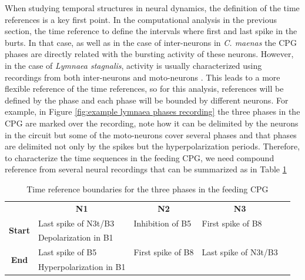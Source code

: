 When studying temporal structures in neural dynamics, the definition of the time references is a key first point. In the computational analysis in the previous section, the time reference to define the intervals where first and last spike in the burts. In that case, as well as in the case of inter-neurons in \textit{C. maenas} the CPG phases are directly related with the bursting activity of these neurons. However, in the case of \textit{Lymnaea stagnalis}, activity is usually characterized using recordings from both inter-neurons and moto-neurons \parencite{elliot, benjamin, crossley}. This leads to a more flexible reference of the time references, so for this analysis, references will be defined by the phase and each phase will be bounded by different neurons. For example, in Figure \ref{fig:example lymnaea phases recording} the three phases in the  CPG are marked over the recording, note how it can be delimited by the neurons in the circuit but some of the moto-neurons cover several phases and that phases are delimited not only by the spikes but the hyperpolarization periods. Therefore, to characterize the time sequences in the feeding CPG, we need compound reference from several neural recordings that can be summarized as in Table \ref{table:cpg ref intervals}

\begin{table}[]
	\begin{tabular}{cl|l|ll}
		\multicolumn{1}{l}{}                                 & \multicolumn{1}{c|}{\textbf{N1}} & \multicolumn{1}{c|}{\textbf{N2}} & \multicolumn{1}{c}{\textbf{N3}} &  \\
		\multicolumn{1}{c|}{\multirow{2}{*}{\textbf{Start}}} & Last spike of N3t/B3             & Inhibition of B5                 & First spike of B8               &  \\
		\multicolumn{1}{c|}{}                                & Depolarization in B1             &                                  &                                 &  \\ \cline{1-4}
		\multicolumn{1}{c|}{\multirow{2}{*}{\textbf{End}}}   & Last spike of B5                 & First spike of B8                & Last spike of N3t/B3            &  \\
		\multicolumn{1}{c|}{}                                & Hyperpolarization in B1          &                                  &                                 & 
	\end{tabular}
	\caption{Time reference boundaries for the three phases in the feeding CPG}
	\label{table:cpg ref intervals}
\end{table}

